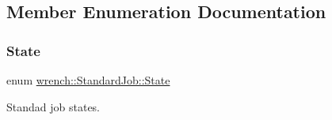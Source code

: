 \subsection{Member Enumeration Documentation}
\mbox{\label{classwrench_1_1_standard_job_adad8bdfd5eb774da5be290864ce89c67}} 
\subsubsection{\texorpdfstring{State}{State}}
{\footnotesize\ttfamily enum \hyperlink{classwrench_1_1_standard_job_adad8bdfd5eb774da5be290864ce89c67}{wrench\+::\+Standard\+Job\+::\+State}}



Standad job states. 

